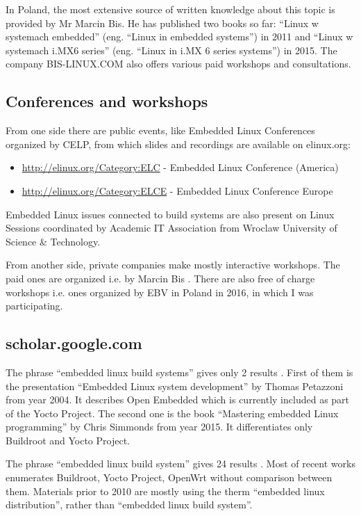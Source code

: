 \documentclass[printmode]{mgr}
\begin{document}
In Poland, the most extensive source of written knowledge about this topic is provided by Mr Marcin Bis.
He has published two books so far: ``Linux w systemach embedded'' (eng. ``Linux in embedded systems'') in 2011 and ``Linux w systemach i.MX6 series'' (eng. ``Linux in i.MX 6 series systems'') in 2015.
The company BIS-LINUX.COM also offers various paid workshops and consultations.

\subsection*{Conferences and workshops}

From one side there are public events, like Embedded Linux Conferences organized by CELP, from which slides and recordings are available on elinux.org:

\begin{itemize}
  \item \url{http://elinux.org/Category:ELC} - Embedded Linux Conference (America)
  \item \url{http://elinux.org/Category:ELCE} - Embedded Linux Conference Europe
\end{itemize}

Embedded Linux issues connected to build systems are also present on Linux Sessions \cite{web:sesja-linuksowa} coordinated by Academic IT Association from Wroclaw University of Science \& Technology.

From another side, private companies make mostly interactive workshops. The paid ones are organized i.e. by Marcin Bis \cite{web:bis-szkolenia}. There are also free of charge workshops i.e. ones organized by EBV in Poland in 2016, in which I was participating.

\subsection*{scholar.google.com}
The phrase ``embedded linux build systems'' gives only 2 results  \cite{web:scholar-1}. First of them is the presentation ``Embedded Linux system development'' by Thomas Petazzoni from year 2004. It describes Open Embedded which is currently included as part of the Yocto Project. The second one is the book ``Mastering embedded Linux programming'' by Chris Simmonds from year 2015. It differentiates only Buildroot and Yocto Project.

The phrase ``embedded linux build system'' gives 24 results \cite{web:scholar-2}. Most of recent works enumerates Buildroot, Yocto Project, OpenWrt without comparison between them. Materials prior to 2010 are mostly using the therm ``embedded linux distribution'', rather than ``embedded linux build system''.
\end{document}

